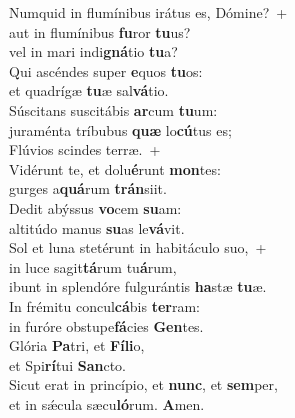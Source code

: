 \evenverse Numquid in flumínibus irátus es, Dómine?~+\\\evenverse  aut in flumínibus \textbf{fu}ror \textbf{tu}us?~\*\\
\evenverse vel in mari indi\textbf{gná}tio \textbf{tu}a?\\
\oddverse Qui ascéndes super \textbf{e}quos \textbf{tu}os:~\*\\
\oddverse et quadrígæ \textbf{tu}æ sal\textbf{vá}tio.\\
\evenverse Súscitans suscitábis \textbf{ar}cum \textbf{tu}um:~\*\\
\evenverse juraménta tríbubus \textbf{quæ} lo\textbf{cú}tus es;\\
\oddverse Flúvios scindes terræ.~+\\
\oddverse  Vidérunt te, et dolu\textbf{é}runt \textbf{mon}tes:~\*\\
\oddverse gurges a\textbf{quá}rum \textbf{trán}siit.\\
\evenverse Dedit abýssus \textbf{vo}cem \textbf{su}am:~\*\\
\evenverse altitúdo manus \textbf{su}as le\textbf{vá}vit.\\
\oddverse Sol et luna stetérunt in habitáculo suo,~+\\
\oddverse  in luce sagit\textbf{tá}rum tu\textbf{á}rum,~\*\\
\oddverse ibunt in splendóre fulgurántis \textbf{ha}stæ \textbf{tu}æ.\\
\evenverse In frémitu concul\textbf{cá}bis \textbf{ter}ram:~\*\\
\evenverse in furóre obstupe\textbf{fá}cies \textbf{Gen}tes.\\
\oddverse Glória \textbf{Pa}tri, et \textbf{Fí}\textbf{li}o,~\*\\
\oddverse et Spi\textbf{rí}tui \textbf{San}cto.\\
\evenverse Sicut erat in princípio, et \textbf{nunc}, et \textbf{sem}per,~\*\\
\evenverse et in sǽcula sæcu\textbf{ló}rum. \textbf{A}men.\\
